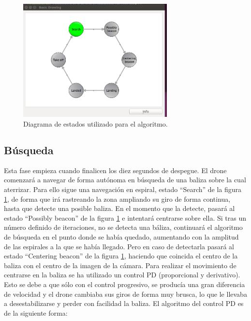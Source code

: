 \begin{figure}[ht]
	\centering
		\includegraphics[width=0.7\textwidth]{imgs/states.png}
        \caption{Diagrama de estados utilizado para el algoritmo.}
	\label{fig:Diag_estados2}
\end{figure}


\subsection{B\'usqueda}
\hspace{1 cm} Esta fase empieza cuando finalicen los diez segundos de despegue. El drone comenzar\'a a navegar de forma aut\'onoma en b\'usqueda de una baliza sobre la cual aterrizar. Para ello sigue una navegaci\'on en espiral, estado "`Search"' de la figura \ref{fig:Diag_estados2}, de forma que ir\'a rastreando la zona ampliando su giro de forma continua, hasta que detecte una posible baliza. En el momento que la detecte, pasar\'a al estado "`Possibly beacon"' de la figura \ref{fig:Diag_estados2} e intentar\'a centrarse sobre ella. Si tras un n\'umero definido de iteraciones, no se detecta una b\'aliza, continuar\'a el algoritmo de b\'usqueda en el punto donde se hab\'ia quedado, aumentando con la amplitud de las espirales a la que se hab\'ia llegado. Pero en caso de detectarla pasar\'a al estado "`Centering beacon"' de la figura \ref{fig:Diag_estados2}, haciendo que coincida el centro de la baliza con el centro de la imagen de la c\'amara. Para realizar el movimiento de centrarse en la baliza se ha utilizado un control PD (proporcional y derivativo). Esto se debe a que s\'olo con el control progresivo, se produc\'ia una gran diferencia de velocidad y el drone cambiaba sus giros de forma muy brusca, lo que le llevaba a desestabilizarse y perder con facilidad la baliza. El algoritmo del control PD es de la siguiente forma:

